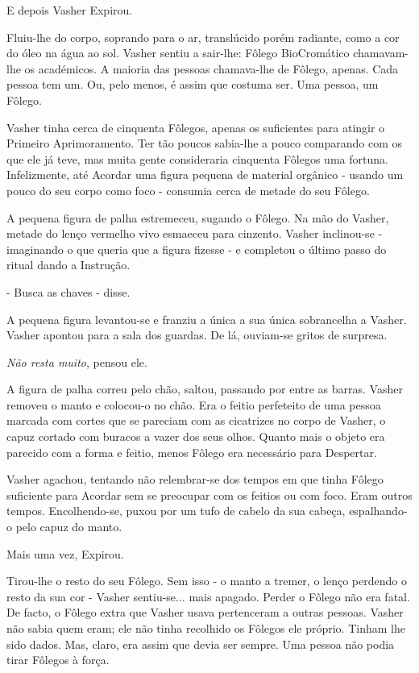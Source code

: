 \documentclass[11pt,a4paper]{book}
\begin{document}
 E depois Vasher Expirou.
 
 Fluiu-lhe do corpo, soprando para o ar, translúcido porém radiante, como a cor do óleo na água ao sol. Vasher sentiu a sair-lhe: Fôlego BioCromático chamavam-lhe os académicos. A maioria das pessoas chamava-lhe de Fôlego, apenas. Cada pessoa tem um. Ou, pelo menos, é assim que costuma ser. Uma pessoa, um Fôlego.
 
 Vasher tinha cerca de cinquenta Fôlegos, apenas os suficientes para atingir o Primeiro Aprimoramento. Ter tão poucos sabia-lhe a pouco comparando com os que ele já teve, mas muita gente consideraria cinquenta Fôlegos uma fortuna. Infelizmente, até Acordar uma figura pequena de material orgânico - usando um pouco do seu corpo como foco - consumia cerca de metade do seu Fôlego. 
 
 A pequena figura de palha estremeceu, sugando o Fôlego. Na mão do Vasher, metade do lenço vermelho vivo esmaeceu para cinzento. Vasher inclinou-se - imaginando o que queria que a figura fizesse - e completou o último passo do ritual dando a Instrução.
 
 - Busca as chaves - disse.
 
 A pequena figura levantou-se e franziu a única a sua única sobrancelha a Vasher. Vasher apontou para a sala dos guardas. De lá, ouviam-se gritos de surpresa.
 
 \textit{Não resta muito}, pensou ele.
 
 A figura de palha correu pelo chão, saltou, passando por entre as barras. Vasher removeu o manto e colocou-o no chão. Era o feitio perfeteito de uma pessoa marcada com cortes que se pareciam com as cicatrizes no corpo de Vasher, o capuz cortado com buracos a vazer dos seus olhos. Quanto mais o objeto era parecido com a forma e feitio, menos Fôlego era necessário para Despertar. 
 
 Vasher agachou, tentando não relembrar-se dos tempos em que tinha Fôlego suficiente para Acordar sem se preocupar com os feitios ou com foco. Eram outros tempos. Encolhendo-se, puxou por um tufo de cabelo da sua cabeça, espalhando-o pelo capuz do manto.
 
 Mais uma vez, Expirou.
 
 Tirou-lhe o resto do seu Fôlego. Sem isso - o manto a tremer, o lenço perdendo o resto da sua cor -  Vasher sentiu-se... mais apagado. Perder o Fôlego não era fatal. De facto, o Fôlego extra que Vasher usava pertenceram a outras pessoas. Vasher não sabia quem eram; ele não tinha recolhido os Fôlegos ele próprio. Tinham lhe sido dados. Mas, claro, era assim que devia ser sempre. Uma pessoa não podia tirar Fôlegos à força. 
 
\end{document}
